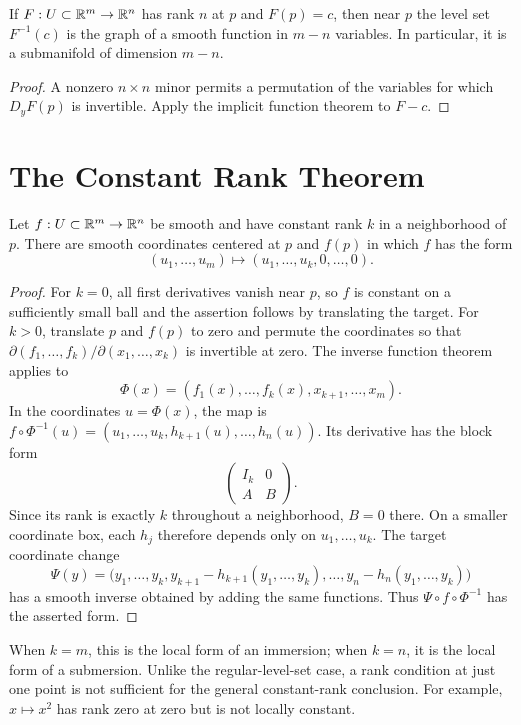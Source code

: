 \begin{corollary}
If $F:U\subset\mathbb R^m\to\mathbb R^n$ has rank $n$ at $p$ and $F(p)=c$, then
near $p$ the level set $F^{-1}(c)$ is the graph of a smooth function in
$m-n$ variables. In particular, it is a submanifold of dimension $m-n$.
\end{corollary}
\begin{proof}
A nonzero $n\times n$ minor permits a permutation of the variables for
which $D_yF(p)$ is invertible. Apply the implicit function theorem to $F-c$.
\end{proof}

\section{The Constant Rank Theorem}
\begin{theorem}
\label{thm:appendix-constant-rank}
Let $f:U\subset\mathbb R^m\to\mathbb R^n$ be smooth and have constant rank $k$ in
a neighborhood of $p$. There are smooth coordinates centered at $p$ and
$f(p)$ in which $f$ has the form
\[
 (u_1,\ldots,u_m)\longmapsto(u_1,\ldots,u_k,0,\ldots,0).
\]
\end{theorem}
\begin{proof}
For $k=0$, all first derivatives vanish near $p$, so $f$ is constant on a
sufficiently small ball and the assertion follows by translating the target.
For $k>0$, translate $p$ and $f(p)$ to zero and permute the coordinates so
that $\partial(f_1,\ldots,f_k)/\partial(x_1,\ldots,x_k)$ is invertible at
zero. The inverse function theorem applies to
\[
 \Phi(x)=(f_1(x),\ldots,f_k(x),x_{k+1},\ldots,x_m).
\]
In the coordinates $u=\Phi(x)$, the map is
$f\circ\Phi^{-1}(u)=(u_1,\ldots,u_k,h_{k+1}(u),\ldots,h_n(u))$.
Its derivative has the block form
\[
 \begin{pmatrix}I_k&0\\ A&B\end{pmatrix}.
\]
Since its rank is exactly $k$ throughout a neighborhood, $B=0$ there.
On a smaller coordinate box, each $h_j$ therefore depends only on
$u_1,\ldots,u_k$. The target coordinate change
\[
 \Psi(y)=\bigl(y_1,\ldots,y_k,
 y_{k+1}-h_{k+1}(y_1,\ldots,y_k),\ldots,
 y_n-h_n(y_1,\ldots,y_k)\bigr)
\]
has a smooth inverse obtained by adding the same functions. Thus
$\Psi\circ f\circ\Phi^{-1}$ has the asserted form.
\end{proof}

When $k=m$, this is the local form of an immersion; when $k=n$, it is
the local form of a submersion. Unlike the regular-level-set case, a rank
condition at just one point is not sufficient for the general constant-rank
conclusion. For example, $x\mapsto x^2$ has rank zero at zero but is not
locally constant.

